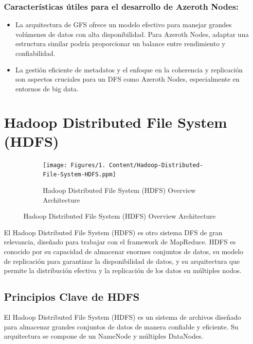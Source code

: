 \subsubsection{Características útiles para el desarrollo de Azeroth Nodes:}

\begin{itemize}
    \item La arquitectura de GFS ofrece un modelo efectivo para manejar grandes volúmenes de datos con alta disponibilidad. Para Azeroth Nodes, adaptar una estructura similar podría proporcionar un balance entre rendimiento y confiabilidad.
    \item La gestión eficiente de metadatos y el enfoque en la coherencia y replicación son aspectos cruciales para un DFS como Azeroth Nodes, especialmente en entornos de big data.
\end{itemize}

\section{Hadoop Distributed File System (HDFS)}

\begin{figure}[H]
    \centering
    \begin{subfigure}[b]{0.5\textwidth}
        \centering
        \texttt{[image: Figures/1. Content/Hadoop-Distributed-File-System-HDFS.ppm]}
        \caption{Hadoop Distributed File System (HDFS) Overview Architecture}
        \label{fig: HDFSArchitecture}
    \end{subfigure}
    \hfill
\end{figure}

El Hadoop Distributed File System (HDFS) es otro sistema DFS de gran relevancia, diseñado para trabajar con el framework de MapReduce. HDFS es conocido por su capacidad de almacenar enormes conjuntos de datos, su modelo de replicación para garantizar la disponibilidad de datos, y su arquitectura que permite la distribución efectiva y la replicación de los datos en múltiples nodos.

\subsection{Principios Clave de HDFS}

El Hadoop Distributed File System (HDFS) es un sistema de archivos diseñado para almacenar grandes conjuntos de datos de manera confiable y eficiente. Su arquitectura se compone de un NameNode y múltiples DataNodes.

